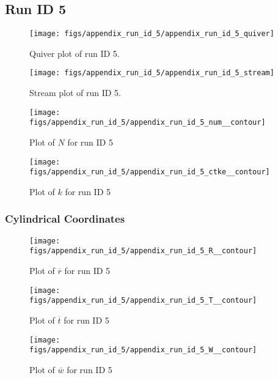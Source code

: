 \subsection{Run ID 5}
\begin{figure}[H]
\centering
\texttt{[image: figs/appendix\_run\_id\_5/appendix\_run\_id\_5\_quiver]}
\caption{Quiver plot of run ID 5.}
\label{fig:appendix_run_id_5_quiver}
\end{figure}


\begin{figure}[H]
\centering
\texttt{[image: figs/appendix\_run\_id\_5/appendix\_run\_id\_5\_stream]}
\caption{Stream plot of run ID 5.}
\label{fig:appendix_run_id_5_stream}
\end{figure}


\begin{figure}[H]
\centering
\texttt{[image: figs/appendix\_run\_id\_5/appendix\_run\_id\_5\_num\_\_contour]}
\caption{Plot of $N$ for run ID 5}
\label{fig:appendix_run_id_5_num__contour}
\end{figure}


\begin{figure}[H]
\centering
\texttt{[image: figs/appendix\_run\_id\_5/appendix\_run\_id\_5\_ctke\_\_contour]}
\caption{Plot of $k$ for run ID 5}
\label{fig:appendix_run_id_5_ctke__contour}
\end{figure}


\subsubsection{Cylindrical Coordinates}
\begin{figure}[H]
\centering
\texttt{[image: figs/appendix\_run\_id\_5/appendix\_run\_id\_5\_R\_\_contour]}
\caption{Plot of $\overline{r}$ for run ID 5}
\label{fig:appendix_run_id_5_R__contour}
\end{figure}


\begin{figure}[H]
\centering
\texttt{[image: figs/appendix\_run\_id\_5/appendix\_run\_id\_5\_T\_\_contour]}
\caption{Plot of $\overline{t}$ for run ID 5}
\label{fig:appendix_run_id_5_T__contour}
\end{figure}


\begin{figure}[H]
\centering
\texttt{[image: figs/appendix\_run\_id\_5/appendix\_run\_id\_5\_W\_\_contour]}
\caption{Plot of $\overline{w}$ for run ID 5}
\label{fig:appendix_run_id_5_W__contour}
\end{figure}


